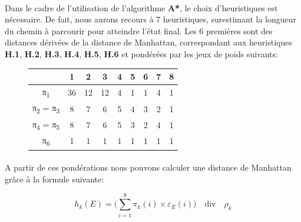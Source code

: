\documentclass[10pt,a4paper]{report}
\begin{document}
\paragraph{} {Dans le cadre de l'utilisation de l'algorithme \textbf{A*}, le choix d'heuristiques est nécessaire. De fait, nous aurons recours à 7 heuristiques, surestimant la longueur du chemin à parcourir pour atteindre l'état final. Les 6 premières sont des distances dérivées de la distance de Manhattan, correspondant aux heuristiques {\bfseries H.1}, {\bfseries H.2}, {\bfseries H.3}, {\bfseries H.4}, {\bfseries H.5}, {\bfseries H.6} et pondérées par les jeux de poids suivants:}
{\scriptsize{}
\renewcommand{\arraystretch}{1.3}
\vspace*{.5cm}
\begin{figure}[h!]
\centering
\begin{tabular}
{| c || c | c | c | c | c | c | c | c |} \hline \textbf{ } & \textbf{1} & \textbf{2} & \textbf{3} & \textbf{4} & \textbf{5} & \textbf{6} & \textbf{7} & \textbf{8} \\ \hline \hline
π\textsubscript{1} & 36 & 12 & 12 & 4 & 1 & 1 & 4 & 1  \\ \hline
π\textsubscript{2} = π\textsubscript{3} & 8 & 7 & 6 & 5 & 4 & 3 & 2 & 1 \\ \hline
π\textsubscript{4} = π\textsubscript{5} & 8 & 7 & 6 & 5 & 3 & 2 & 4 & 1 \\ \hline
π\textsubscript{6} & 1 & 1 & 1 & 1 & 1 & 1 & 1 & 1 \\ \hline
\end{tabular}
\end{figure} \vspace*{.5cm}}
\paragraph{}{A partir de ces pondérations nous pouvons calculer une distance de Manhattan grâce à la formule suivante:}
\begin{figure}[h!]
\centering
\[{h}_{k}({E})=\Bigg({\sum_{i=1}^{8}}\pi _{k}(i) \times \varepsilon _{E}(i)\Bigg) \quad \textrm{div} \quad \rho _{k}\]
\label{calculponderations}
\end{figure}
\end{document}
